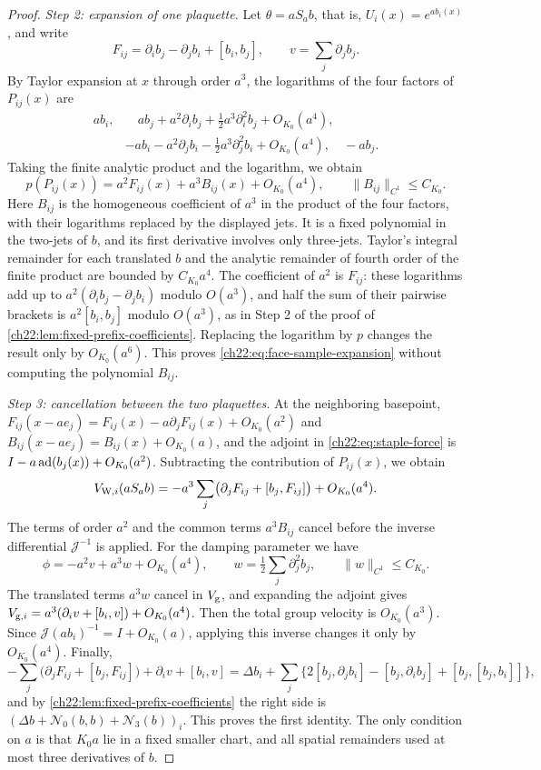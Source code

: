 \begin{proof}
\emph{Step 2: expansion of one plaquette.} Let $\theta=aS_ab$, that is, $U_i(x)=e^{ab_i(x)}$, and write
\[
 F_{ij}=\partial_ib_j-\partial_jb_i+[b_i,b_j],\qquad v=\sum_j\partial_jb_j .
\]
By Taylor expansion at $x$ through order $a^3$, the logarithms of the four factors of $P_{ij}(x)$ are
\[
 \begin{split}
 ab_i,&\quad ab_j+a^2\partial_ib_j+\tfrac12a^3\partial_i^2b_j+O_{K_0}(a^4),\\
 &-ab_i-a^2\partial_jb_i-\tfrac12a^3\partial_j^2b_i+O_{K_0}(a^4),\quad -ab_j .
 \end{split}
\]
Taking the finite analytic product and the logarithm, we obtain
\begin{equation}\label{ch22:eq:face-sample-expansion}
 p(P_{ij}(x))=a^2F_{ij}(x)+a^3B_{ij}(x)+O_{K_0}(a^4),\qquad \|B_{ij}\|_{C^1}\le C_{K_0}.
\end{equation}
Here $B_{ij}$ is the homogeneous coefficient of $a^3$ in the product of the four factors, with their logarithms replaced by the displayed jets. It is a fixed polynomial in the two-jets of $b$, and its first derivative involves only three-jets. Taylor's integral remainder for each translated $b$ and the analytic remainder of fourth order of the finite product are bounded by $C_{K_0}a^4$. The coefficient of $a^2$ is $F_{ij}$: these logarithms add up to $a^2(\partial_ib_j-\partial_jb_i)$ modulo $O(a^3)$, and half the sum of their pairwise brackets is $a^2[b_i,b_j]$ modulo $O(a^3)$, as in Step 2 of the proof of \cref{ch22:lem:fixed-prefix-coefficients}. Replacing the logarithm by $p$ changes the result only by $O_{K_0}(a^6)$. This proves \eqref{ch22:eq:face-sample-expansion} without computing the polynomial $B_{ij}$.

\emph{Step 3: cancellation between the two plaquettes.} At the neighboring basepoint, $F_{ij}(x-ae_j)=F_{ij}(x)-a\partial_jF_{ij}(x)+O_{K_0}(a^2)$ and $B_{ij}(x-ae_j)=B_{ij}(x)+O_{K_0}(a)$, and the adjoint in \eqref{ch22:eq:staple-force} is $I-a\operatorname{ad}(b_j(x))+O_{K_0}(a^2)$. Subtracting the contribution of $P_{ij}(x)$, we obtain
\[
 V_{{\rm W},i}(aS_ab)=-a^3\sum_j\bigl(\partial_jF_{ij}+[b_j,F_{ij}]\bigr)+O_{K_0}(a^4).
\]
The terms of order $a^2$ and the common terms $a^3B_{ij}$ cancel before the inverse differential $\mathcal J^{-1}$ is applied. For the damping parameter we have
\[
 \phi=-a^2v+a^3w+O_{K_0}(a^4),\qquad w=\tfrac12\sum_j\partial_j^2b_j,\qquad \|w\|_{C^1}\le C_{K_0}.
\]
The translated terms $a^3w$ cancel in $V_{\rm g}$, and expanding the adjoint gives $V_{{\rm g},i}=a^3(\partial_iv+[b_i,v])+O_{K_0}(a^4)$. Then the total group velocity is $O_{K_0}(a^3)$. Since $\mathcal J(ab_i)^{-1}=I+O_{K_0}(a)$, applying this inverse changes it only by $O_{K_0}(a^4)$. Finally,
\[
 -\sum_j\bigl(\partial_jF_{ij}+[b_j,F_{ij}]\bigr)+\partial_iv+[b_i,v]
 =\Delta b_i+\sum_j\bigl\{2[b_j,\partial_jb_i]-[b_j,\partial_ib_j]+[b_j,[b_j,b_i]]\bigr\},
\]
and by \cref{ch22:lem:fixed-prefix-coefficients} the right side is $(\Delta b+\mathcal N_0(b,b)+\mathscr N_3(b))_i$. This proves the first identity. The only condition on $a$ is that $K_0a$ lie in a fixed smaller chart, and all spatial remainders used at most three derivatives of $b$.


\end{proof}
